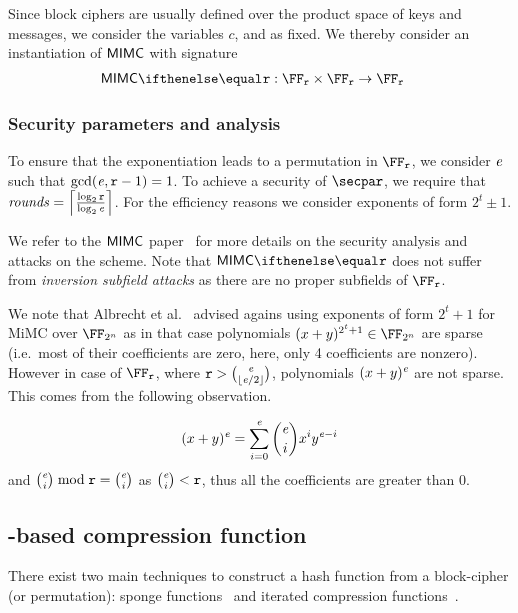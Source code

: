 Since block ciphers are usually defined over the product space of keys and messages, we consider the variables $c$, \rounds{} and \exponent{} as fixed. We thereby consider an instantiation of $\mathsf{MIMC{}}$ with signature
\begin{align*}
    \mimcPrime{\rCURVE} &: \FFx{\rCURVE} \times \FFx{\rCURVE} \to \FFx{\rCURVE}
\end{align*}

\subsubsection{Security parameters and analysis}\label{instantiation:mkhash:mimc-encryption:security}

To ensure that the exponentiation leads to a permutation in $\FFx{\rCURVE}$, we
consider $\mathit{e}{}$ such that $\gcd(\mathit{e}{}, \mathtt{r}-1) = 1$. To achieve
a security of $\secpar$, we require that $\mathit{rounds} = \left\lceil \frac{\log_2
    \mathtt{r}}{\log_2 \mathit{e}{}} \right\rceil$. For the efficiency reasons we
consider exponents of form $2^t \pm 1$.

We refer to the $\mathsf{MIMC{}}$ paper~\cite[Section 4.2 and 5.1]{albrecht2016mimc} for more details on the security analysis and attacks on the scheme. Note that $\mimcPrime{\rCURVE}$ does not suffer from \emph{inversion subfield attacks} as there are no proper subfields of $\FFx{\rCURVE}$.

We note that Albrecht et al.~\cite[Section 5.3]{albrecht2016mimc} advised agains
using exponents of form $2^t + 1$ for MiMC over $\FFx{2^n}$ as in that case
polynomials $(x + y)^{2^t + 1} \in \FFx{2^n}$ are sparse (i.e.~most of their
coefficients are zero, here, only 4 coefficients are nonzero). However in case
of $\FFx{\rCURVE}$, where $\mathtt{r} > \binom{\mathit{e}}{\lfloor \mathit{e} / 2
  \rfloor}$, polynomials $(x + y)^{\mathit{e}}$ are not sparse. This comes from
the following observation.

\[
  (x + y)^{\mathit{e}} = \sum_{i = 0}^{\mathit{e}} \binom{\mathit{e}}{i} x^{i}y^{\mathit{e} - i}
\]
and $\binom{\mathit{e}}{i} \bmod \mathtt{r} = \binom{\mathit{e}}{i}$ as $\binom{\mathit{e}}{i} < \mathtt{r}$, thus all the coefficients are greater than $0$.

\subsection{\mimc{}-based compression function}\label{instantiation:mkhash:mimc-compressionf}

There exist two main techniques to construct a hash function from a block-cipher (or permutation): sponge functions~\cite{bertoni2007sponge} and iterated compression functions~\cite{black2002black}.

